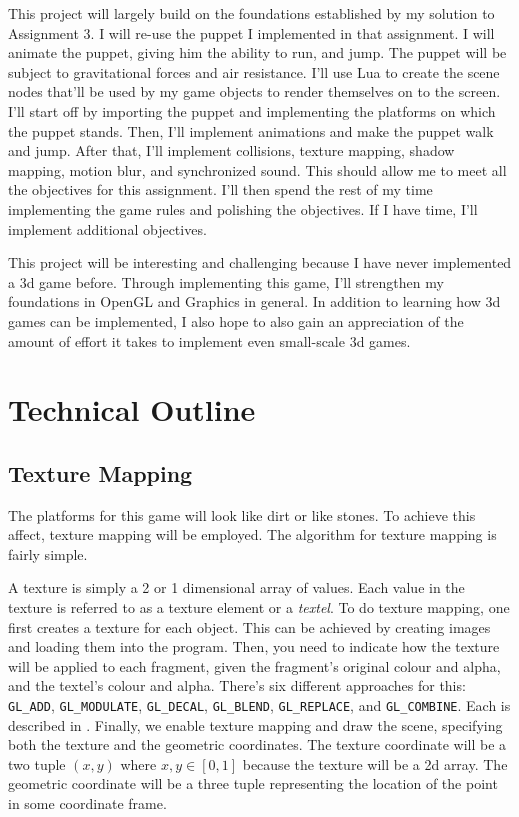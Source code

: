 \documentclass[11pt]{article}
\begin{document}
This project will largely build on the foundations established by my solution to Assignment 3. I will re-use the  puppet I implemented in that assignment. I will animate the puppet, giving him the ability to run, and jump. The puppet will be subject to gravitational forces and air resistance. I'll use Lua to create the scene nodes that'll be used by my game objects to render themselves on to the screen. I'll start off by importing the puppet and implementing the platforms on which the puppet stands. Then, I'll implement animations and make the puppet walk and jump. After that, I'll implement collisions, texture mapping, shadow mapping, motion blur, and synchronized sound. This should allow me to meet all the objectives for this assignment. I'll then spend the rest of my time implementing the game rules and polishing the objectives. If I have time, I'll implement additional objectives.

This project will be interesting and challenging because I have never implemented a 3d game before. Through implementing this game, I'll strengthen my foundations in OpenGL and Graphics in general. In addition to learning how 3d games can be implemented, I also hope to also gain an appreciation of the amount of effort it takes to implement even small-scale 3d games. 

\section{Technical Outline}
\subsection{Texture Mapping}
The platforms for this game will look like dirt or like stones. To achieve this affect, texture mapping will be employed. The algorithm for texture mapping is fairly simple.

A texture is simply a 2 or 1 dimensional array of values. Each value in the texture is referred to as a texture element or a \textit{textel}. To do texture mapping, one first creates a texture for each object. This can be achieved by creating images and loading them into the program. Then, you need to indicate how the texture will be applied to each fragment, given the fragment's original colour and alpha, and the textel's colour and alpha. There's six different approaches for this: \verb|GL_ADD|, \verb|GL_MODULATE|, \verb|GL_DECAL|, \verb|GL_BLEND|, \verb|GL_REPLACE|, and \verb|GL_COMBINE|. Each is described in \cite{texture-map-fn}. Finally, we enable texture mapping and draw the scene, specifying both the texture and the geometric coordinates. The texture coordinate will be a two tuple $(x, y)$ where $x,y \in [0, 1]$ because the texture will be a 2d array. The geometric coordinate will be a three tuple representing the location of the point in some coordinate frame.
\end{document}
